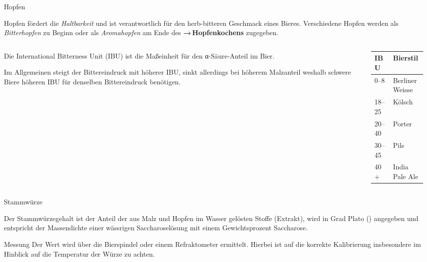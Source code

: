\documentclass[9pt, ngerman]{beamer}
\newcommand{\forward}[1]{\textbf{→\,#1}}
\begin{document}
\begin{frame}{Hopfen}

  Hopfen fördert die \emph{Haltbarkeit} und ist verantwortlich für den
  herb-bitteren Geschmack eines Bieres. Verschiedene Hopfen werden als
  \emph{Bitterhopfen} zu Beginn oder als \emph{Aromahopfen} am Ende des
  \forward{Hopfenkochens} zugegeben.

  \begin{columns}[onlytextwidth]
    \begin{column}{0.6\textwidth}

      Die International Bitterness Unit (IBU) ist die Maßeinheit für den
      α-Säure-Anteil im Bier.

      Im Allgemeinen steigt der Bittereindruck mit höherer IBU, sinkt allerdings
      bei höherem Malzanteil weshalb schwere Biere höheren IBU für denselben
      Bittereindruck benötigen.

    \end{column}

    \begin{column}{0.4\textwidth}
      \begin{table}
        \begin{tabular}{ll}
          \textbf{IBU} & \textbf{Bierstil}\\
          \midrule
          \numrange{0}{8}   & Berliner Weisse\\
          \numrange{18}{25} & Kölsch\\
          \numrange{20}{40} & Porter\\
          \numrange{30}{45} & Pils\\
          40+               & India Pale Ale\\
        \end{tabular}
      \end{table}
    \end{column}
  \end{columns}

\end{frame}
\begin{frame}{Stammwürze}

  Der Stammwürzegehalt ist der Anteil der aus Malz und Hopfen im Wasser gelösten
  Stoffe (Extrakt), wird in Grad Plato (\si{\dP})  angegeben und entspricht der
  Massendichte einer wässrigen Saccharoselösung mit einem Gewichtsprozent
  Saccharose.

  \begin{block}{Messung}
    \vspace{0.5em}
    Der Wert wird über die Bierspindel oder einem Refraktometer ermittelt.
    Hierbei ist auf die korrekte Kalibrierung insbesondere im Hinblick auf die
    Temperatur der Würze zu achten.
  \end{block}
\end{frame}
\end{document}
